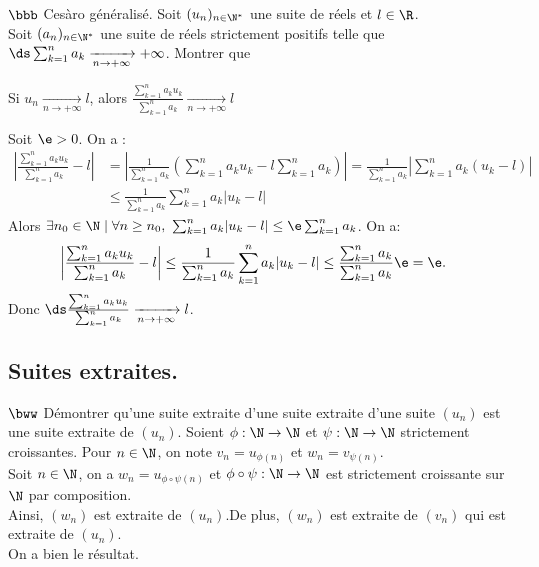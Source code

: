 \documentclass[11pt]{article}
\begin{document}
\begin{exercice}{$\bbb$ Cesàro généralisé.}{}
    Soit $(u_n)_{n\in\N^*}$ une suite de réels et $l\in\R$.\\
    Soit $(a_n)_{n\in\N^*}$ une suite de réels strictement positifs telle que $\ds\sum_{k=1}^na_k\xrightarrow[n\to+\infty]{}+\infty$. Montrer que
    \begin{center}
        Si $u_n\xrightarrow[n\to+\infty]{}l$, alors $\frac{\sum\limits_{k=1}^na_ku_k}{\sum\limits_{k=1}^na_k}\xrightarrow[n\to+\infty]{}l$
    \end{center}
    \tcblower
    Soit $\e>0$. On a :
    \begin{align*}
        \left|\frac{\sum_{k=1}^na_ku_k}{\sum_{k=1}^na_k} - l\right| &= \left| \frac{1}{\sum_{k=1}^na_k}\left( \sum_{k=1}^na_ku_k - l\sum_{k=1}^na_k \right)\right|
        =\frac{1}{\sum_{k=1}^na_k}\left|\sum_{k=1}^na_k(u_k - l)\right|\\
        &\leq \frac{1}{\sum_{k=1}^na_k}\sum_{k=1}^na_k|u_k - l|
    \end{align*}
    Alors $\exists n_0 \in \N \mid \forall n \geq n_0, ~ \sum_{k=1}^na_k|u_k - l| \leq \e\sum_{k=1}^na_k$. On a:
    \begin{align*}
        \left|\frac{\sum_{k=1}^na_ku_k}{\sum_{k=1}^na_k}-l\right|\leq\frac{1}{\sum_{k=1}^na_k}\sum_{k=1}^na_k|u_k - l| &\leq \frac{\sum_{k=1}^na_k}{\sum_{k=1}^na_k}\e = \e.
    \end{align*}
    Donc $\ds\frac{\sum_{k=1}^na_ku_k}{\sum_{k=1}^na_k}\xrightarrow[n\to+\infty]{}l$.
\end{exercice}

\pagebreak

\subsection*{Suites extraites.}

\begin{exercice}{$\bww$}{}
    Démontrer qu'une suite extraite d'une suite extraite d'une suite $(u_n)$ est une suite extraite de $(u_n)$.
    \tcblower
    Soient $\phi:\N\to\N$ et $\psi:\N\to\N$ strictement croissantes. Pour $n\in\N$, on note $v_n=u_{\phi(n)}$ et $w_n=v_{\psi(n)}$.\\
    Soit $n\in\N$, on a $w_n = u_{\phi\circ\psi(n)}$ et $\phi\circ\psi:\N\to\N$ est strictement croissante sur $\N$ par composition.\\
    Ainsi, $(w_n)$ est extraite de $(u_n). $De plus, $(w_n)$ est extraite de $(v_n)$ qui est extraite de $(u_n)$.\\
    On a bien le résultat. 
\end{exercice}
\end{document}
